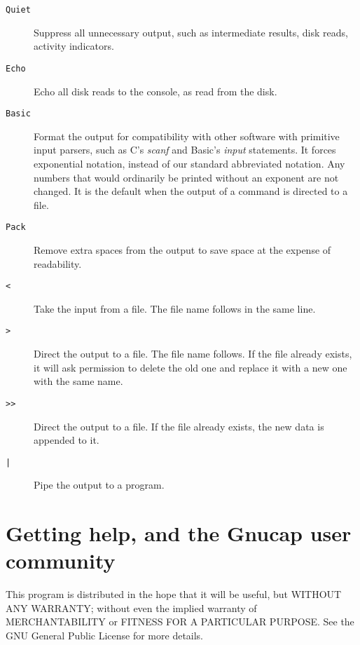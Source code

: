 \begin{description}

\item[{\tt Quiet}] Suppress all unnecessary output, such as intermediate
results, disk reads, activity indicators.

\item[{\tt Echo}] Echo all disk reads to the console, as read from the disk.

\item[{\tt Basic}] Format the output for compatibility with other software
with primitive input parsers, such as C's {\em scanf} and Basic's {\em
input} statements.  It forces exponential notation, instead of our
standard abbreviated notation.  Any numbers that would ordinarily be
printed without an exponent are not changed.  It is the default when
the output of a command is directed to a file.

\item[{\tt Pack}] Remove extra spaces from the output to save space at the 
expense of readability.

\item[{\tt <}] Take the input from a file.  The file name follows in the
same line.

\item[{\tt >}] Direct the output to a file.  The file name follows.  If the
file already exists, it will ask permission to delete the old one and
replace it with a new one with the same name.

\item[{\tt >>}] Direct the output to a file.  If the file already exists,
the new data is appended to it.

\item[{\tt |}] Pipe the output to a program.

\end{description}
\section{Getting help, and the Gnucap user community}

This program is distributed in the hope that it will be useful, but WITHOUT
ANY WARRANTY; without even the implied warranty of MERCHANTABILITY or
FITNESS FOR A PARTICULAR PURPOSE.  See the GNU General Public License for
more details.

